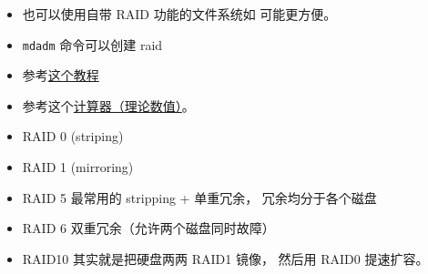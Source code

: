 
\begin{issues}
\issueDraft
\end{issues}

\begin{itemize}
\item 也可以使用自带 RAID 功能的文件系统如  可能更方便。
\item \verb`mdadm` 命令可以创建 raid
\item 参考\href{https://www.digitalocean.com/community/tutorials/how-to-create-raid-arrays-with-mdadm-on-ubuntu-22-04}{这个教程}
\item 参考这个\href{https://www.raid-calculator.com/}{计算器（理论数值）}。
\item RAID 0 (striping)
\item RAID 1 (mirroring)
\item RAID 5 最常用的 stripping + 单重冗余， 冗余均分于各个磁盘
\item RAID 6 双重冗余（允许两个磁盘同时故障）
\item RAID10 其实就是把硬盘两两 RAID1 镜像， 然后用 RAID0 提速扩容。
\end{itemize}
